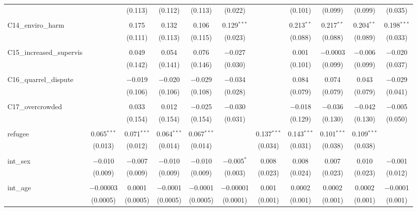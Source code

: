 \begin{table}[H]
\begin{tabular}{@{\extracolsep{4pt}}lcccccccccc}
  &  & (0.113) & (0.112) & (0.113) & (0.022) &  & (0.101) & (0.099) & (0.099) & (0.035) \\ 
  & & & & & & & & & & \\ 
 C14\_enviro\_harm &  & 0.175 & 0.132 & 0.106 & 0.129$^{***}$ &  & 0.213$^{**}$ & 0.217$^{**}$ & 0.204$^{**}$ & 0.198$^{***}$ \\ 
  &  & (0.111) & (0.113) & (0.115) & (0.023) &  & (0.088) & (0.088) & (0.089) & (0.033) \\ 
  & & & & & & & & & & \\ 
 C15\_increased\_supervis &  & 0.049 & 0.054 & 0.076 & $-$0.027 &  & 0.001 & $-$0.0003 & $-$0.006 & $-$0.020 \\ 
  &  & (0.142) & (0.141) & (0.146) & (0.030) &  & (0.101) & (0.099) & (0.099) & (0.037) \\ 
  & & & & & & & & & & \\ 
 C16\_quarrel\_dispute &  & $-$0.019 & $-$0.020 & $-$0.029 & $-$0.034 &  & 0.084 & 0.074 & 0.043 & $-$0.029 \\ 
  &  & (0.106) & (0.106) & (0.108) & (0.028) &  & (0.079) & (0.079) & (0.079) & (0.041) \\ 
  & & & & & & & & & & \\ 
 C17\_overcrowded &  & 0.033 & 0.012 & $-$0.025 & $-$0.030 &  & $-$0.018 & $-$0.036 & $-$0.042 & $-$0.005 \\ 
  &  & (0.154) & (0.154) & (0.154) & (0.031) &  & (0.129) & (0.130) & (0.130) & (0.050) \\ 
  & & & & & & & & & & \\ 
 refugee & 0.065$^{***}$ & 0.071$^{***}$ & 0.064$^{***}$ & 0.067$^{***}$ &  & 0.137$^{***}$ & 0.143$^{***}$ & 0.101$^{***}$ & 0.109$^{***}$ &  \\ 
  & (0.013) & (0.012) & (0.014) & (0.014) &  & (0.034) & (0.031) & (0.038) & (0.038) &  \\ 
  & & & & & & & & & & \\ 
 int\_sex & $-$0.010 & $-$0.007 & $-$0.010 & $-$0.010 & $-$0.005$^{*}$ & 0.008 & 0.008 & 0.007 & 0.010 & $-$0.001 \\ 
  & (0.009) & (0.009) & (0.009) & (0.009) & (0.003) & (0.023) & (0.024) & (0.023) & (0.023) & (0.012) \\ 
  & & & & & & & & & & \\ 
 int\_age & $-$0.00003 & 0.0001 & $-$0.0001 & $-$0.0001 & $-$0.00001 & 0.001 & 0.0002 & 0.0002 & 0.0002 & $-$0.0001 \\ 
  & (0.0005) & (0.0005) & (0.0005) & (0.0005) & (0.0001) & (0.001) & (0.001) & (0.001) & (0.001) & (0.001) \\ 

\end{tabular}
\end{table}
